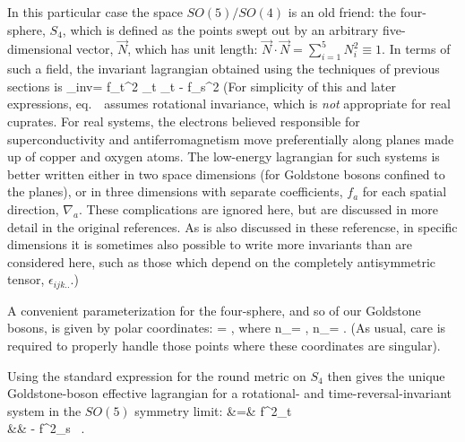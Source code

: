 \documentclass[12pt,epsf]{report}
\def\nq{n_\ssq}
\def\ns{n_\ssS}
\def\inv{{\rm inv}}
\begin{document}
In this particular case the space $SO(5)/SO(4)$ is an old
friend: the four-sphere, $S_4$, which is defined as the
points swept out by an arbitrary five-dimensional vector,
$\vec{N}$, which has unit length: $\vec{N} \cdot \vec{N} =
\sum_{i=1}^5 N_i^2 \equiv 1$. In terms of such a field, the
invariant lagrangian obtained using the techniques of
previous sections is
%
\eq
\label{simpinvlagr}
\Scl_\inv = {f_t^2 } \;
\partial_t  \cdot  \partial_t
  - {f_s^2 } \; \nabla
{} \cdot  \nabla  {}
\eeq
%
(For simplicity of this and later expressions, 
eq.~\ assumes rotational invariance,
which is 
{\it not} appropriate for real cuprates. For real systems,
the electrons believed responsible for superconductivity
and antiferromagnetism move preferentially along planes
made up of copper and oxygen atoms. The low-energy
lagrangian for such systems is better written either in two
space dimensions (for Goldstone bosons confined to the
planes), or in three dimensions with separate coefficients,
$f_a$ for each spatial direction, 
$\nabla_a$. These complications are ignored here, but are
discussed in more detail in the original references. As is
also discussed in these referencse, in specific dimensions
it is sometimes also possible to write more invariants than
are considered here, such as those which depend on the
completely antisymmetric tensor, $\epsilon_{ijk..}$.)

A convenient parameterization for the four-sphere, and so
of our Goldstone bosons, is given by polar coordinates:
%
\eq
\label{explangles}
 = \pmatrix{\nq \cr \ns \cr}, 
\qquad \hbox{where}
\qquad
\nq = \cos\theta  \pmatrix{\cos\phi 
\cr \sin\phi \cr}, \qquad
\ns = \sin\theta \pmatrix{ \sin\alpha 
\cos\beta \cr  \sin\alpha \sin\beta \cr
\cos\alpha\cr} .
\eeq
%
(As usual, care is required to properly handle those points
where these coordinates are singular).

Using the standard expression for the round metric on $S_4$
then gives the unique Goldstone-boson effective lagrangian
for a rotational- and time-reversal-invariant system in the
$SO(5)$ symmetry limit:
%
\bg
\label{kintermanglesinv}
\Scl &=& {f^2_t }  \nn\\
&& \qquad \qquad - \;  {f^2_s } \;  \, .\nn
\nd
\end{document}
